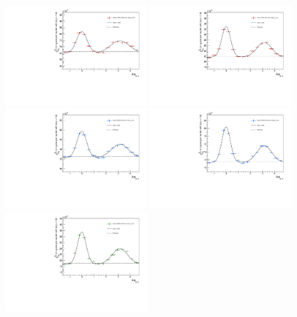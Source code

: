 \begin{figure}[ht]
    \centering
    \includegraphics[width=0.48\textwidth]{figures/analysis/h_lambda_dphi_gaus_0_20_lowpt.pdf}
    \includegraphics[width=0.48\textwidth]{figures/analysis/h_lambda_dphi_gaus_0_20_highpt.pdf}
    \includegraphics[width=0.48\textwidth]{figures/analysis/h_lambda_dphi_gaus_20_50_lowpt.pdf}
    \includegraphics[width=0.48\textwidth]{figures/analysis/h_lambda_dphi_gaus_20_50_highpt.pdf}
    \includegraphics[width=0.48\textwidth]{figures/analysis/h_lambda_dphi_gaus_50_80_lowpt.pdf}

\end{figure}
